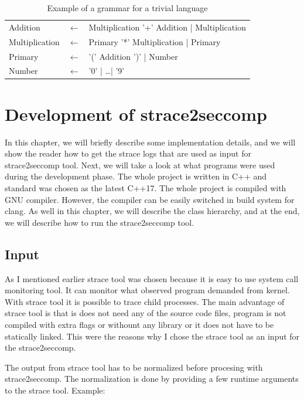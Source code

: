 \begin{table}[h]
	\begin{center}
  \begin{tabular}{lcl}
      Addition       & $\leftarrow$ & Multiplication '+' Addition | Multiplication \\
      Multiplication & $\leftarrow$ & Primary '*' Multiplication | Primary     \\
      Primary        & $\leftarrow$ & '(' Addition ')' | Number          \\
      Number        & $\leftarrow$ & '0' | \ldots | '9'
  \end{tabular}
  \end{center}
  \caption{Example of a grammar for a trivial language}
  \label{fig:pegtl:example}
\end{table}

\chapter{Development of strace2seccomp}
In this chapter, we will briefly describe some implementation details, and we
will show the reader how to get the strace logs that are used as input for
strace2seccomp tool. Next, we will take a look at what programs were used during
the development phase. The whole project is written in C++ and standard was
chosen as the latest C++17. The whole project is compiled with GNU compiler.
However, the compiler can be easily switched in build system for clang. As well
in this chapter, we will describe the class hierarchy, and at the end, we will
describe how to run the strace2seccomp tool.

\section{Input}
\label{strace_params}
As I mentioned earlier strace tool was chosen because it is easy to use system
call monitoring tool. It can monitor what observed program demanded from kernel.
With strace tool it is possible to trace child processes. The main advantage of
strace tool is that is does not need any of the source code files, program is not
compiled with extra flags or withount any library or it does not have to be
statically linked. This were the reasons why I chose the strace tool as an input
for the strace2seccomp.

The output from strace tool has to be normalized before procesing with strace2seccomp.
The normalization is done by providing a few runtime arguments to the strace tool.
Example:

